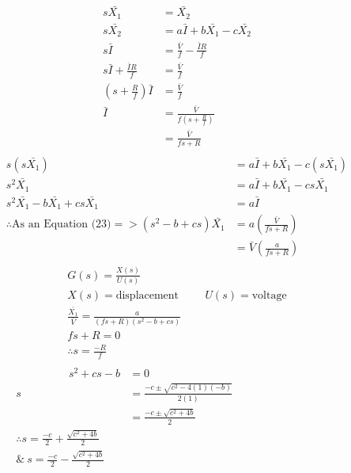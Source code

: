     \begin{align}\nonumber
        s\bar{X_1} &= \bar{X_2} \\ \nonumber
        s\bar{X_2} &= a\bar{I} + b\bar{X_1} - c\bar{X_2}\\ \nonumber
        s\bar{I} &=\frac{\bar{V}}{f} - \frac{\bar{I}R}{f}\\ \nonumber
        s\bar{I} + \frac{\bar{I}R}{f} &=\frac{\bar{V}}{f} \\ \nonumber
        \left(s+\frac{R}{f}\right)\bar{I} &=\frac{\bar{V}}{f} \\ \nonumber
        \bar{I} &=\frac{\bar{V}}{f\left( s+\frac{R}{f}\right)}  \\ \nonumber &=\frac{\bar{V}}{fs+R} \\
    \end{align}
    \begin{align}\nonumber 
         s\left(s\bar{X_1}\right) &= a\bar{I} + b\bar{X_1} - c\left(s\bar{X_1}\right)\\ \nonumber
         s^2\bar{X_1} &= a\bar{I} + b\bar{X_1} - cs\bar{X_1}\\ \nonumber
         s^2\bar{X_1} - b\bar{X_1} + cs\bar{X_1} &= a\bar{I}\\ \nonumber
         \therefore \text{As an Equation (23)} => (s^2 - b + cs)\bar{X_1} &= a\left(\frac{\bar{V}}{fs+R}\right)\\ \nonumber
         &= \bar{V}\left(\frac{a}{fs+R}\right)\\ \nonumber
    \end{align}
    \begin{align}\nonumber
         G(s) = \frac{X(s)}{U(s)} \hspace{3cm}\\ \nonumber
         X(s) = \text{displacement} \hspace{1cm} U(s) = \text{voltage} \\ \nonumber
         \frac{\bar{X_1}}{\bar{V}} = \frac{a}{(fs+R)(s^2 - b + cs)} \hspace{3cm}\\ \nonumber
         fs + R = 0 \hspace{3cm}\\ \nonumber
         \therefore s = \frac{-R}{f}\\
    \end{align}
    \begin{align}\nonumber
         \hspace{2cm}s^2 + cs -b &= 0 \\ \nonumber
         s &= \frac{-c \pm \sqrt{c^2 -4(1)(-b)}}{2(1)}\hspace{4cm} \\ \nonumber
         &= \frac{-c \pm \sqrt{c^2 + 4b}}{2}\hspace{4cm} \\ \nonumber
         \therefore s = \frac{-c}{2} + \frac{\sqrt{c^2 + 4b}}{2} \\ \&\ s= \frac{-c}{2} - \frac{\sqrt{c^2 + 4b}}{2}\\
    \end{align}
